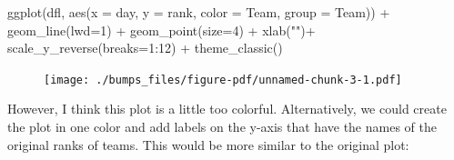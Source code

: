 \documentclass[
  letterpaper,
  DIV=11,
  numbers=noendperiod]{scrreprt}
\newenvironment{Shaded}{\begin{snugshade}}{\end{snugshade}}
\newcommand{\AttributeTok}[1]{\textcolor[rgb]{0.40,0.45,0.13}{#1}}
\newcommand{\DecValTok}[1]{\textcolor[rgb]{0.68,0.00,0.00}{#1}}
\newcommand{\FunctionTok}[1]{\textcolor[rgb]{0.28,0.35,0.67}{#1}}
\newcommand{\NormalTok}[1]{\textcolor[rgb]{0.00,0.23,0.31}{#1}}
\newcommand{\SpecialCharTok}[1]{\textcolor[rgb]{0.37,0.37,0.37}{#1}}
\newcommand{\StringTok}[1]{\textcolor[rgb]{0.13,0.47,0.30}{#1}}
\begin{document}
\begin{Shaded}
\begin{Highlighting}[]
\FunctionTok{ggplot}\NormalTok{(dfl, }\FunctionTok{aes}\NormalTok{(}\AttributeTok{x =}\NormalTok{ day, }\AttributeTok{y =}\NormalTok{ rank, }\AttributeTok{color =}\NormalTok{ Team, }\AttributeTok{group =}\NormalTok{ Team)) }\SpecialCharTok{+}
  \FunctionTok{geom\_line}\NormalTok{(}\AttributeTok{lwd=}\DecValTok{1}\NormalTok{) }\SpecialCharTok{+}
  \FunctionTok{geom\_point}\NormalTok{(}\AttributeTok{size=}\DecValTok{4}\NormalTok{) }\SpecialCharTok{+}
  \FunctionTok{xlab}\NormalTok{(}\StringTok{""}\NormalTok{)}\SpecialCharTok{+}
  \FunctionTok{scale\_y\_reverse}\NormalTok{(}\AttributeTok{breaks=}\DecValTok{1}\SpecialCharTok{:}\DecValTok{12}\NormalTok{) }\SpecialCharTok{+}
  \FunctionTok{theme\_classic}\NormalTok{()}
\end{Highlighting}
\end{Shaded}

\begin{figure}[H]

{\centering \texttt{[image: ./bumps\_files/figure-pdf/unnamed-chunk-3-1.pdf]}

}

\end{figure}

However, I think this plot is a little too colorful. Alternatively, we
could create the plot in one color and add labels on the y-axis that
have the names of the original ranks of teams. This would be more
similar to the original plot:

\begin{Shaded}
\end{Shaded}
\end{document}

